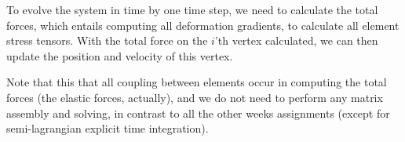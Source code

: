 \documentclass[sigconf]{acmart}
\begin{document}
To evolve the system in time by one time step, we need to calculate the total forces, which entails computing all deformation gradients, to calculate all element stress tensors. With the total force on the $ i $'th vertex calculated, we can then update the position and velocity of this vertex.

Note that this that all coupling between elements occur in computing the total forces (the elastic forces, actually), and we do not need to perform any matrix assembly and solving, in contrast to all the other weeks assignments (except for semi-lagrangian explicit time integration).
\end{document}
